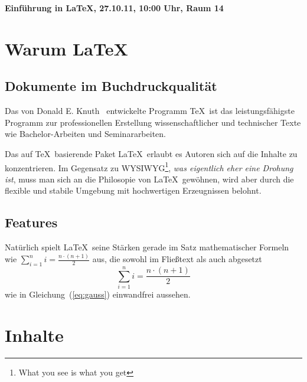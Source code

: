 \documentclass[10pt,a4paper]{article}
\begin{document}
\begin{center}
\large\bf Einführung in \LaTeX,
27.10.11, 10:00 Uhr, Raum 14
\end{center}

\begin{minipage}{86mm}
\begin{abstract}
Bachelor- oder Seminararbeit schreiben und keine Krise 
kurz vor der Abgabe haben? 
Professionelles Layout und das alles 
ganz automatisch?
\LaTeX\ ist Ihre Wahl.
\end{abstract}

\section{Warum \LaTeX}

\subsection{Dokumente im Buchdruckqualität}

Das von Donald E. Knuth~\cite{bib:Knuth91} entwickelte
Programm \TeX\ ist das leistungsfähigste Programm
zur professionellen Erstellung wissenschaftlicher
und technischer Texte wie Bachelor-Arbeiten und 
Seminararbeiten.

Das auf \TeX\ basierende Paket \LaTeX\ erlaubt es Autoren 
sich auf die Inhalte zu konzentrieren.
Im Gegensatz zu WYSIWYG\footnote{What you see is what you get},
\emph{was eigentlich eher eine Drohung ist},
muss man sich an die Philosopie von \LaTeX\ gewöhnen,
wird aber durch die flexible und stabile Umgebung mit 
hochwertigen Erzeugnissen belohnt. 

\subsection{Features} \label{sec:features}

Natürlich spielt \LaTeX\ seine Stärken gerade im 
Satz mathematischer Formeln wie 
$\sum_{i=1}^{n} i = \frac{n \cdot (n+1)}{2}$ 
aus, die sowohl im Fließtext als auch abgesetzt 
\begin{equation} \label{eq:gauss}
\sum_{i=1}^{n} i = \frac{n \cdot (n+1)}{2}
\end{equation}
wie in Gleichung~(\ref{eq:gauss}) einwandfrei aussehen.

\section{Inhalte}


\end{minipage}
\end{document}
